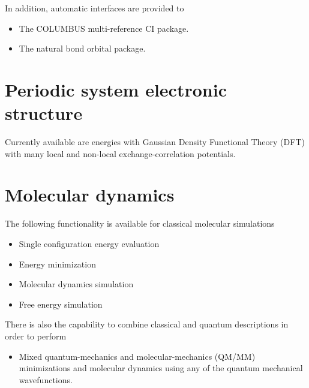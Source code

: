 In addition, automatic interfaces are provided to
\begin{itemize}
\item The COLUMBUS multi-reference CI package.
\item The natural bond orbital package.
\end{itemize}

\section{Periodic system electronic structure}

Currently available are energies with Gaussian Density Functional
Theory (DFT) with many local and non-local exchange-correlation
potentials.

\section{Molecular dynamics}

The following functionality is available for classical molecular
simulations
\begin{itemize}
\item Single configuration energy evaluation
\item Energy minimization
\item Molecular dynamics simulation
\item Free energy simulation 
\end{itemize}

There is also the capability to combine classical and quantum
descriptions in order to perform
\begin{itemize}
\item Mixed quantum-mechanics and molecular-mechanics (QM/MM)
  minimizations and molecular dynamics using any of the quantum
  mechanical wavefunctions.
\end{itemize}




